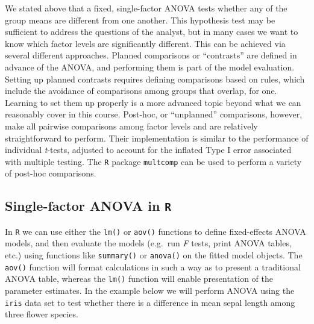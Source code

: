 \documentclass[
]{book}
\newenvironment{Shaded}{\begin{snugshade}}{\end{snugshade}}
\newcommand{\AttributeTok}[1]{\textcolor[rgb]{0.77,0.63,0.00}{#1}}
\newcommand{\DecValTok}[1]{\textcolor[rgb]{0.00,0.00,0.81}{#1}}
\newcommand{\FloatTok}[1]{\textcolor[rgb]{0.00,0.00,0.81}{#1}}
\newcommand{\FunctionTok}[1]{\textcolor[rgb]{0.00,0.00,0.00}{#1}}
\newcommand{\NormalTok}[1]{#1}
\newcommand{\SpecialCharTok}[1]{\textcolor[rgb]{0.00,0.00,0.00}{#1}}
\newcommand{\StringTok}[1]{\textcolor[rgb]{0.31,0.60,0.02}{#1}}
\begin{document}
We stated above that a fixed, single-factor ANOVA tests whether any of the group means are different from one another. This hypothesis test may be sufficient to address the questions of the analyst, but in many cases we want to know which factor levels are significantly different. This can be achieved via several different approaches. Planned comparisons or ``contrasts'' are defined in advance of the ANOVA, and performing them is part of the model evaluation. Setting up planned contrasts requires defining comparisons based on rules, which include the avoidance of comparisons among groups that overlap, for one. Learning to set them up properly is a more advanced topic beyond what we can reasonably cover in this course. Post-hoc, or ``unplanned'' comparisons, however, make all pairwise comparisons among factor levels and are relatively straightforward to perform. Their implementation is similar to the performance of individual \emph{t}-tests, adjusted to account for the inflated Type I error associated with multiple testing. The \texttt{R} package \texttt{multcomp} can be used to perform a variety of post-hoc comparisons.

\hypertarget{single-factor-anova-in-r}{%
\subsection{\texorpdfstring{Single-factor ANOVA in \texttt{R}}{Single-factor ANOVA in R}}\label{single-factor-anova-in-r}}

In \texttt{R} we can use either the \texttt{lm()} or \texttt{aov()} functions to define fixed-effects ANOVA models, and then evaluate the models (e.g.~run \emph{F} tests, print ANOVA tables, etc.) using functions like \texttt{summary()} or \texttt{anova()} on the fitted model objects. The \texttt{aov()} function will format calculations in such a way as to present a traditional ANOVA table, whereas the \texttt{lm()} function will enable presentation of the parameter estimates. In the example below we will perform ANOVA using the \texttt{iris} data set to test whether there is a difference in mean sepal length among three flower species.

\begin{Shaded}
\end{Shaded}
\end{document}
